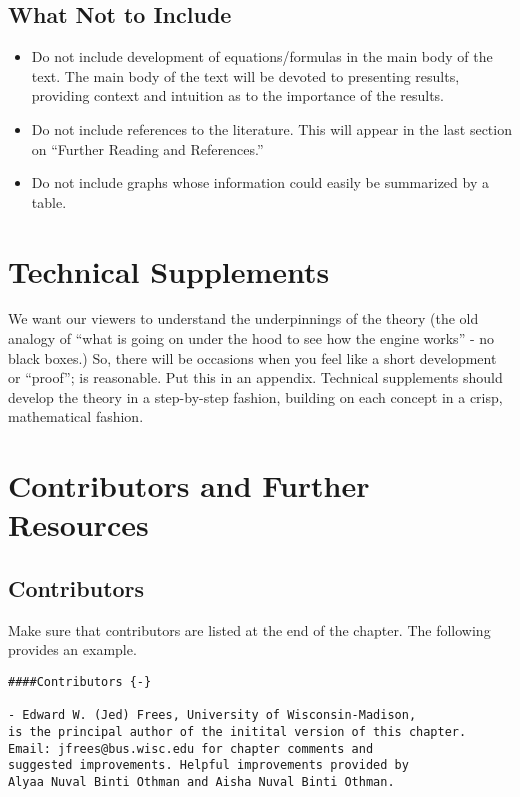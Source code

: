 \documentclass[
]{book}
\begin{document}
\hypertarget{what-not-to-include}{%
\subsection{What Not to Include}\label{what-not-to-include}}

\begin{itemize}
\item
  Do not include development of equations/formulas in the main body of the text. The main body of the text will be devoted to presenting results, providing context and intuition as to the importance of the results.
\item
  Do not include references to the literature. This will appear in the last section on ``Further Reading and References.''
\item
  Do not include graphs whose information could easily be summarized by a table.
\end{itemize}

\hypertarget{technical-supplements}{%
\section{Technical Supplements}\label{technical-supplements}}

We want our viewers to understand the underpinnings of the theory (the old analogy of ``what is going on under the hood to see how the engine works'' - no black boxes.) So, there will be occasions when you feel like a short development or ``proof''; is reasonable. Put this in an appendix. Technical supplements should develop the theory in a step-by-step fashion, building on each concept in a crisp, mathematical fashion.

\hypertarget{S:further-reading-and-resources}{%
\section{Contributors and Further Resources}\label{S:further-reading-and-resources}}

\hypertarget{contributors}{%
\subsection{Contributors}\label{contributors}}

Make sure that contributors are listed at the end of the chapter. The following provides an example.

\begin{verbatim}
####Contributors {-}

- Edward W. (Jed) Frees, University of Wisconsin-Madison, 
is the principal author of the initital version of this chapter. 
Email: jfrees@bus.wisc.edu for chapter comments and 
suggested improvements. Helpful improvements provided by
Alyaa Nuval Binti Othman and Aisha Nuval Binti Othman.
\end{verbatim}
\end{document}
